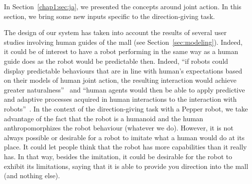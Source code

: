 \documentclass[a4paper,11pt,twoside]{StyleThese}
\begin{document}
In Section~\ref{chap1:sec:ja}, we presented the concepts around joint action. In this section, we bring some new inputs specific to the direction-giving task. 

The design of our system has taken into account the results of several user studies involving human guides of the mall (see Section~\ref{sec:modeling}). Indeed, it could be of interest to have a robot performing in the same way as a human guide does as the robot would be predictable then. Indeed, ``if robots could display predictable behaviours that are in line with human's expectations based on their models of human joint action, the resulting interaction would achieve greater naturalness''~\citep[p.~17]{curioni_2017_joint} and ``human agents would then be able to apply predictive and adaptive processes acquired in human interactions to the interaction with robots''~\citep[p.17]{curioni_2017_joint}. In the context of the direction-giving task with a Pepper robot, we take advantage of the fact that the robot is a humanoid and the human anthropomorphizes the robot behaviour (whatever we do).
However, it is not always possible or desirable for a robot to imitate what a human would do at its place. It could let people think that the robot has more capabilities than it really has. In that way, besides the imitation, it could be desirable for the robot to exhibit its limitations, \eg saying that it is able to provide you direction into the mall (and nothing else).
%
%
\end{document}
